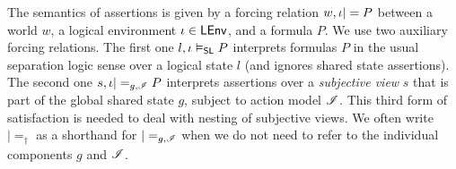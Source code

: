 The semantics of \colosl assertions is given by a forcing relation $w,\iota|= P$ between a world $w$, a logical environment $\iota\in\textsf{LEnv}$, and a formula $P$. We use two auxiliary forcing relations. The first one $l,\iota\mathrel{\vDash_{\mathsf{SL}}} P$ interprets formulas $P$ in the usual separation
logic sense over a logical state $l$ (and ignores shared state assertions). The second one $s,\iota|=_{g,\mathscr{I}} P$ interprets assertions over a \emph{subjective view} $s$ that is part of the global shared state $g$, subject to action model $\mathscr{I}$. This third form of satisfaction is needed to deal with nesting of subjective views. We often write $|=_{\dagger}$ as a shorthand for $|=_{g, \mathscr{I}}$ when we do not need to refer to the individual components $g$ and $\mathscr{I}$. 
%

